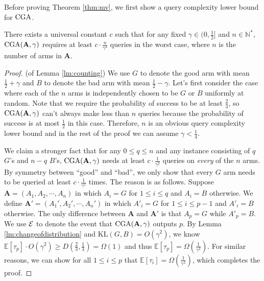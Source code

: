  
 Before proving Theorem \ref{thm:mv}, we first show a query complexity lower bound for ${\mathrm{CGA}}$.
\begin{lemma}
\label{lm:counting}
There exists a universal constant $c$ such that for any fixed $\gamma\in(0,\frac{1}{2}]$ and $n\in\mathbb N^*$, ${\mathrm{CGA}}(\mathbf A,\gamma)$ requires at least $c\cdot\frac{n}{\gamma^2}$ queries in the worst case, where $n$ is the number of arms in $\mathbf A$.
\end{lemma}

\begin{proof}(of Lemma \ref{lm:counting})
We use $G$ to denote the good arm with mean $\frac{1}{2}+\gamma$ and $B$ to denote the bad arm with mean $\frac{1}{2}-\gamma$. Let's first consider the case where each of the $n$ arms is independently chosen to be $G$ or $B$ uniformly at random. Note that we require the probability of success to be at least $\frac 23$, so ${\mathrm{CGA}}(\mathbf A,\gamma)$ can't always make less than $n$ queries because the probability of success is at most $\frac 12$ in this case. Therefore, $n$ is an obvious query complexity lower bound and in the rest of the proof we can assume $\gamma<\frac 14$.

We claim a stronger fact that for any $0\leq q\leq n$ and any instance consisting of $q$ $G$'s and $n-q$ $B$'s, ${\mathrm{CGA}}(\mathbf A,\gamma)$ needs at least $c\cdot\frac{1}{\gamma^2}$ queries on \emph{every} of the $n$ arms. By symmetry between ``good'' and ``bad'', we only show that every $G$ arm needs to be queried at least $c\cdot\frac{1}{\gamma^2}$ times. The reason is as follows. Suppose $\mathbf A=(A_1,A_2,\cdots,A_n)$ in which $A_i=G$ for $1\leq i\leq q$ and $A_i=B$ otherwise. We define $\mathbf A'=(A_1',A_2',\cdots,A_n')$ in which $A'_i=G$ for $1\leq i\leq p-1$ and $A'_i=B$ otherwise. The only difference between $\mathbf A$ and $\mathbf A'$ is that $A_p=G$ while $A'_p=B$. We use ${\mathcal E}$ to denote the event that ${\mathrm{CGA}}(\mathbf A,\gamma)$ outputs $p$. By Lemma \ref{lm:changeofdistribution} and $\mathrm{KL}(G,B)=O(\gamma^2)$, we know $\mathbb E[\tau_p]\cdot O(\gamma^2)\geq D(\frac{2}{3},\frac{1}{3})=\Omega(1)$ and thus $\mathbb E[\tau_p]=\Omega(\frac{1}{\gamma^2})$. For similar reasons, we can show for all $1\leq i\leq p$ that $\mathbb E[\tau_i]=\Omega(\frac{1}{\gamma^2})$, which completes the proof.
\end{proof}

